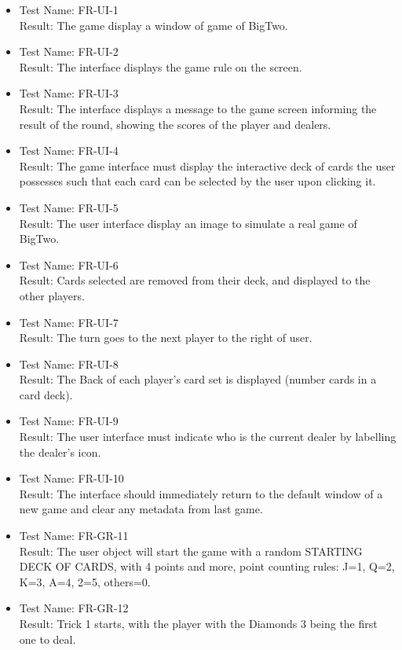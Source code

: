\documentclass[12pt, titlepage]{article}
\begin{document}
\begin{itemize}
\item[]
Test Name: FR-UI-1\\
Result: The game display a window of game of BigTwo.

\item[] 
Test Name: FR-UI-2\\
Result: The interface displays the game rule on the screen.

\item[]
Test Name: FR-UI-3\\
Result: The interface displays a message to the game screen informing the result of the round, showing the scores of the player and dealers.

\item[]
Test Name: FR-UI-4\\
Result: The game interface must display the interactive deck of cards the user possesses such  that  each  card  can  be  selected  by  the  user  upon clicking it.

\item[]
Test Name: FR-UI-5\\
Result: The user interface display an image to simulate a real game of BigTwo.

\item[]
Test Name: FR-UI-6\\
Result: Cards selected are removed from their deck, and displayed to the other players.

\item[]
Test Name: FR-UI-7\\
Result: The turn goes to the next player to the right of user.


\item[]
Test Name: FR-UI-8\\
Result: The Back of each player's card set is displayed (number cards in a card deck).

\item[]
Test Name: FR-UI-9\\
Result: The user interface must indicate who is the current dealer by labelling the dealer's icon.

\item[]
Test Name: FR-UI-10\\
Result: The interface should immediately return to the default window of a new game and clear any metadata from last game.
\item[]
Test Name: FR-GR-11\\
Result: The user object will start the game with a random STARTING DECK OF CARDS, with 4 points and more, point counting rules:  J=1, Q=2, K=3, A=4, 2=5, others=0.
\item[]
Test Name: FR-GR-12\\
Result: Trick 1 starts, with the player with the Diamonds 3 being the first one to deal.


\end{itemize}
\end{document}
